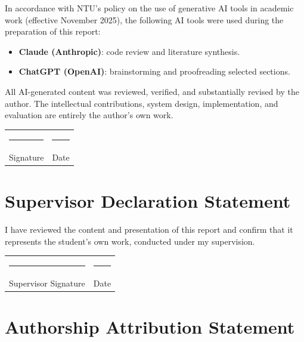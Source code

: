 \noindent In accordance with NTU's policy on the use of generative AI tools in academic work (effective November 2025), the following AI tools were used during the preparation of this report:

\begin{itemize}[leftmargin=2cm]
  \item \textbf{Claude (Anthropic)}: code review and literature synthesis.
  \item \textbf{ChatGPT (OpenAI)}: brainstorming and proofreading selected sections.
\end{itemize}

\noindent All AI-generated content was reviewed, verified, and substantially revised by the author. The intellectual contributions, system design, implementation, and evaluation are entirely the author's own work.

\vspace{2cm}

\begin{tabular}{@{}ll}
  \rule{6cm}{0.4pt} & \rule{4cm}{0.4pt} \\
  Signature                & Date
\end{tabular}

\newpage

\chapter*{Supervisor Declaration Statement}

I have reviewed the content and presentation of this report and confirm that it represents the student's own work, conducted under my supervision.

\vspace{3cm}

\begin{tabular}{@{}ll}
  \rule{6cm}{0.4pt} & \rule{4cm}{0.4pt} \\
  Supervisor Signature     & Date
\end{tabular}

\newpage

\chapter*{Authorship Attribution Statement}


